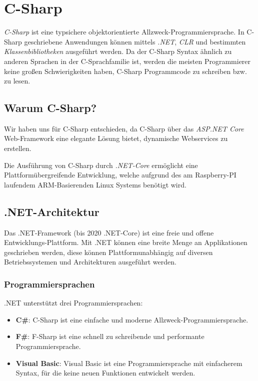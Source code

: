 \section{C-Sharp}
\label{C-Sharp}

\textit{C-Sharp} ist eine typsichere objektorientierte Allzweck-Programmiersprache.
In C-Sharp geschriebene Anwendungen können mittels \textit{.NET}, \textit{CLR} und bestimmten 
\textit{Klassenbibliotheken} ausgeführt werden. 
Da der C-Sharp Syntax ähnlich zu anderen Sprachen in der C-Sprachfamilie ist, werden die meisten
Programmierer keine großen Schwierigkeiten haben, C-Sharp Programmcode zu schreiben bzw. zu lesen.  
\cite{csharpmicrosoft}

\subsection{Warum C-Sharp?}
Wir haben uns für C-Sharp entschieden, da C-Sharp über das \textit{ASP.NET Core} Web-Framework eine elegante 
Lösung bietet, dynamische Webservices zu erstellen.

Die Ausführung von C-Sharp durch \textit{.NET-Core} ermöglicht eine Plattformübergreifende Entwicklung, 
welche aufgrund des am Raspberry-PI laufendem ARM-Basierenden Linux Systems benötigt wird.

\subsection{.NET-Architektur}
Das .NET-Framework (bis 2020 .NET-Core) ist eine freie und offene Entwicklungs-Plattform. Mit .NET können eine breite Menge an
Applikationen geschrieben werden, diese können Plattformunabhängig auf diversen Betriebssystemen
und Architekturen ausgeführt werden. \cite{dotnetmicrosoft} 

\subsubsection{Programmiersprachen}
.NET unterstützt drei Programmiersprachen:
\begin{itemize}
    \item \textbf{C\#}: C-Sharp ist eine einfache und moderne Allzweck-Programmiersprache.
    \item \textbf{F\#}: F-Sharp ist eine schnell zu schreibende und performante Programmiersprache.
    \item \textbf{Visual Basic}: Visual Basic ist eine Programmiersprache mit einfacherem Syntax, für die keine
    neuen Funktionen entwickelt werden.  
\end{itemize}

